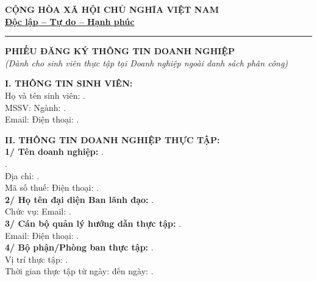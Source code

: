 \documentclass[12pt]{article}
\newcommand{\densedotfill}{\leavevmode\cleaders\hbox{.\hspace{1.5pt}}\hfill\kern0pt}
\begin{document}
\begin{center}
    \textbf{CỘNG HÒA XÃ HỘI CHỦ NGHĨA VIỆT NAM}\\
    \textbf{\underline{Độc lập -- Tự do -- Hạnh phúc}}\\
    \vspace{0.1cm}
    \rule{4cm}{0.5pt}
\end{center}

\vspace{0.5cm}

\begin{center}
    \textbf{\large PHIẾU ĐĂNG KÝ THÔNG TIN DOANH NGHIỆP}\\[0.2cm]
    \textit{(Dành cho sinh viên thực tập tại Doanh nghiệp ngoài danh sách phân công)}
\end{center}

\vspace{0.5cm}

\noindent \textbf{I. THÔNG TIN SINH VIÊN:}\\[0.2cm]
Họ và tên sinh viên: \densedotfill \\[0.2cm]
MSSV: \makebox[0.4\textwidth]{\densedotfill} Ngành: \densedotfill \\[0.2cm]
Email: \makebox[0.4\textwidth]{\densedotfill} Điện thoại: \densedotfill \\[0.2cm]

\vspace{0.3cm}

\noindent \textbf{II. THÔNG TIN DOANH NGHIỆP THỰC TẬP:}\\[0.2cm]
\textbf{1/ Tên doanh nghiệp:} \densedotfill \\[0.2cm]
\densedotfill \\[0.2cm]
Địa chỉ: \densedotfill \\[0.2cm]
Mã số thuế: \makebox[0.4\textwidth]{\densedotfill} Điện thoại: \densedotfill \\[0.2cm]
\textbf{2/ Họ tên đại diện Ban lãnh đạo:} \densedotfill \\[0.2cm]
Chức vụ: \makebox[0.4\textwidth]{\densedotfill} Email: \densedotfill \\[0.2cm]
\textbf{3/ Cán bộ quản lý hướng dẫn thực tập:} \densedotfill \\[0.2cm]
Email: \makebox[0.4\textwidth]{\densedotfill} Điện thoại: \densedotfill \\[0.2cm]
\textbf{4/ Bộ phận/Phòng ban thực tập:} \densedotfill \\[0.2cm]
Vị trí thực tập: \densedotfill \\[0.2cm]
Thời gian thực tập từ ngày: \makebox[0.3\textwidth]{\densedotfill} đến ngày: \densedotfill \\[0.4cm]
\end{document}
